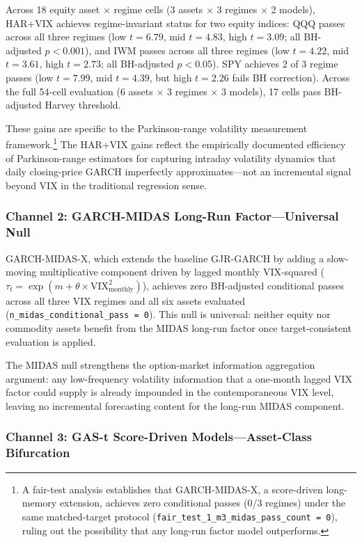 \documentclass[12pt,a4paper]{article}
\begin{document}
Across 18 equity asset $\times$ regime cells (3 assets $\times$ 3 regimes $\times$ 2 models), HAR+VIX achieves regime-invariant status for two equity indices: QQQ passes across all three regimes (low $t=6.79$, mid $t=4.83$, high $t=3.09$; all BH-adjusted $p < 0.001$), and IWM passes across all three regimes (low $t=4.22$, mid $t=3.61$, high $t=2.73$; all BH-adjusted $p < 0.05$). SPY achieves 2 of 3 regime passes (low $t=7.99$, mid $t=4.39$, but high $t=2.26$ fails BH correction). Across the full 54-cell evaluation (6 assets $\times$ 3 regimes $\times$ 3 models), 17 cells pass BH-adjusted Harvey threshold.

These gains are specific to the Parkinson-range volatility measurement framework.\footnote{A fair-test analysis establishes that GARCH-MIDAS-X, a score-driven long-memory extension, achieves zero conditional passes (0/3 regimes) under the same matched-target protocol (\texttt{fair\_test\_1\_m3\_midas\_pass\_count = 0}), ruling out the possibility that any long-run factor model outperforms.} The HAR+VIX gains reflect the empirically documented efficiency of Parkinson-range estimators for capturing intraday volatility dynamics that daily closing-price GARCH imperfectly approximates---not an incremental signal beyond VIX in the traditional regression sense.

\subsubsection{Channel 2: GARCH-MIDAS Long-Run Factor---Universal Null}

GARCH-MIDAS-X, which extends the baseline GJR-GARCH by adding a slow-moving multiplicative component driven by lagged monthly VIX-squared ($\tau_t = \exp(m + \theta \times \text{VIX}^2_{\text{monthly}})$), achieves zero BH-adjusted conditional passes across all three VIX regimes and all six assets evaluated (\texttt{n\_midas\_conditional\_pass = 0}). This null is universal: neither equity nor commodity assets benefit from the MIDAS long-run factor once target-consistent evaluation is applied.

The MIDAS null strengthens the option-market information aggregation argument: any low-frequency volatility information that a one-month lagged VIX factor could supply is already impounded in the contemporaneous VIX level, leaving no incremental forecasting content for the long-run MIDAS component.

\subsubsection{Channel 3: GAS-t Score-Driven Models---Asset-Class Bifurcation}
\end{document}
